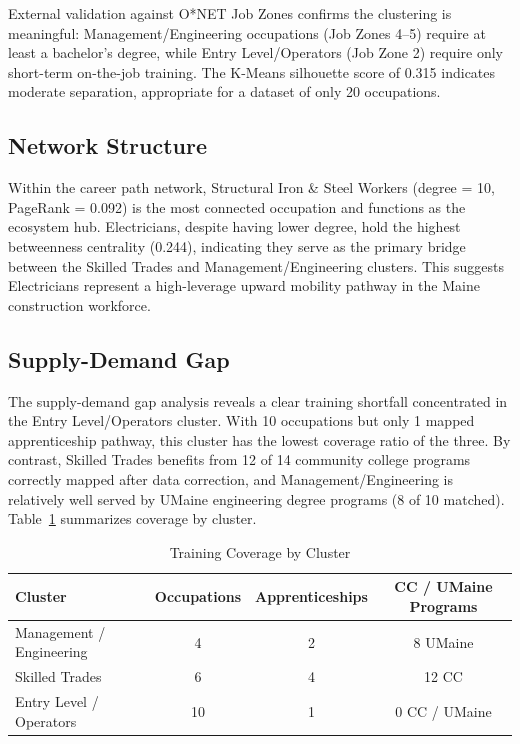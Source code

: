 \documentclass[12pt]{article}
\begin{document}
External validation against O*NET Job Zones confirms the
clustering is meaningful: Management/Engineering occupations
(Job Zones 4--5) require at least a bachelor's degree, while
Entry Level/Operators (Job Zone 2) require only short-term
on-the-job training. The K-Means silhouette score of 0.315
indicates moderate separation, appropriate for a dataset of
only 20 occupations.

\subsection{Network Structure}

Within the career path network, Structural Iron \& Steel Workers
(degree = 10, PageRank = 0.092) is the most connected occupation
and functions as the ecosystem hub. Electricians, despite having
lower degree, hold the highest betweenness centrality (0.244),
indicating they serve as the primary bridge between the Skilled
Trades and Management/Engineering clusters. This suggests
Electricians represent a high-leverage upward mobility pathway
in the Maine construction workforce.

\subsection{Supply-Demand Gap}

The supply-demand gap analysis reveals a clear training shortfall
concentrated in the Entry Level/Operators cluster. With 10
occupations but only 1 mapped apprenticeship pathway, this
cluster has the lowest coverage ratio of the three. By contrast,
Skilled Trades benefits from 12 of 14 community college programs
correctly mapped after data correction, and Management/Engineering
is relatively well served by UMaine engineering degree programs
(8 of 10 matched). Table~\ref{tab:gap} summarizes coverage by
cluster.

\begin{table}[H]
\centering
\caption{Training Coverage by Cluster}
\label{tab:gap}
\begin{tabular}{lccc}
\toprule
\textbf{Cluster} & \textbf{Occupations} & \textbf{Apprenticeships} & \textbf{CC / UMaine Programs} \\
\midrule
Management / Engineering & 4  & 2 & 8 UMaine \\
Skilled Trades           & 6  & 4 & 12 CC    \\
Entry Level / Operators  & 10 & 1 & 0 CC / UMaine \\
\bottomrule
\end{tabular}
\end{table}
\end{document}
